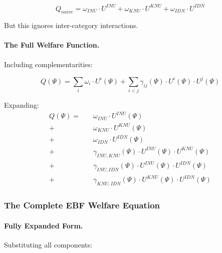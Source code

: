 \begin{equation}
Q_{naive} = \omega_{INU} \cdot U^{INU} + \omega_{KNU} \cdot U^{KNU} + \omega_{IDN} \cdot U^{IDN}
\end{equation}

But this ignores inter-category interactions.

\paragraph{The Full Welfare Function.}
Including complementarities:

\begin{equation}
\boxed{
Q(\Psi) = \sum_{i} \omega_i \cdot U^i(\Psi) + \sum_{i < j} \gamma_{ij}(\Psi) \cdot U^i(\Psi) \cdot U^j(\Psi)
}
\label{eq:total-welfare}
\end{equation}

Expanding:
\begin{align}
Q(\Psi) = \quad & \omega_{INU} \cdot U^{INU}(\Psi) \nonumber \\
+ \quad & \omega_{KNU} \cdot U^{KNU}(\Psi) \nonumber \\
+ \quad & \omega_{IDN} \cdot U^{IDN}(\Psi) \nonumber \\
+ \quad & \gamma_{INU,KNU}(\Psi) \cdot U^{INU}(\Psi) \cdot U^{KNU}(\Psi) \nonumber \\
+ \quad & \gamma_{INU,IDN}(\Psi) \cdot U^{INU}(\Psi) \cdot U^{IDN}(\Psi) \nonumber \\
+ \quad & \gamma_{KNU,IDN}(\Psi) \cdot U^{KNU}(\Psi) \cdot U^{IDN}(\Psi)
\label{eq:welfare-expanded}
\end{align}

\subsubsection{The Complete EBF Welfare Equation}

\paragraph{Fully Expanded Form.}
Substituting all components:

